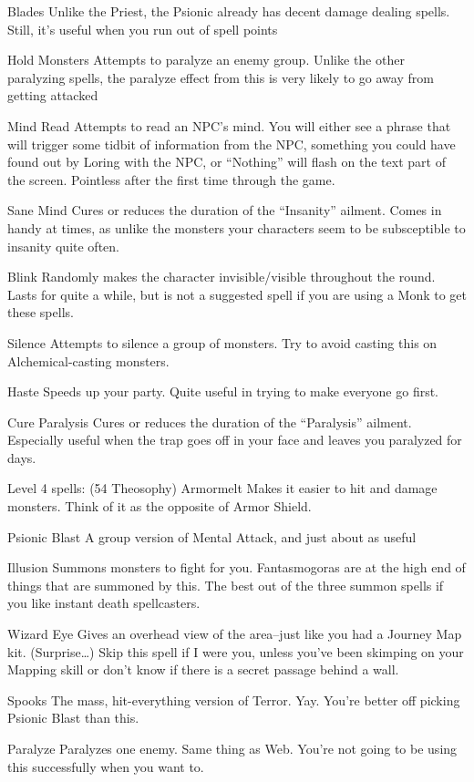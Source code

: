\documentclass[12pt]{article}
\begin{document}
Blades Unlike the Priest, the Psionic already has decent damage dealing
spells. Still, it's useful when you run out of spell points

Hold Monsters Attempts to paralyze an enemy group. Unlike the other
paralyzing spells, the paralyze effect from this is very likely to go
away from getting attacked

Mind Read Attempts to read an NPC's mind. You will either see a phrase
that will trigger some tidbit of information from the NPC, something you
could have found out by Loring with the NPC, or ``Nothing'' will flash
on the text part of the screen. Pointless after the first time through
the game.

Sane Mind Cures or reduces the duration of the ``Insanity'' ailment.
Comes in handy at times, as unlike the monsters your characters seem to
be subsceptible to insanity quite often.

Blink Randomly makes the character invisible/visible throughout the
round. Lasts for quite a while, but is not a suggested spell if you are
using a Monk to get these spells.

Silence Attempts to silence a group of monsters. Try to avoid casting
this on Alchemical-casting monsters.

Haste Speeds up your party. Quite useful in trying to make everyone go
first.

Cure Paralysis Cures or reduces the duration of the ``Paralysis''
ailment. Especially useful when the trap goes off in your face and
leaves you paralyzed for days.

Level 4 spells: (54 Theosophy) Armormelt Makes it easier to hit and
damage monsters. Think of it as the opposite of Armor Shield.

Psionic Blast A group version of Mental Attack, and just about as useful

Illusion Summons monsters to fight for you. Fantasmogoras are at the
high end of things that are summoned by this. The best out of the three
summon spells if you like instant death spellcasters.

Wizard Eye Gives an overhead view of the area--just like you had a
Journey Map kit. (Surprise\ldots{}) Skip this spell if I were you,
unless you've been skimping on your Mapping skill or don't know if there
is a secret passage behind a wall.

Spooks The mass, hit-everything version of Terror. Yay. You're better
off picking Psionic Blast than this.

Paralyze Paralyzes one enemy. Same thing as Web. You're not going to be
using this successfully when you want to.
\end{document}

